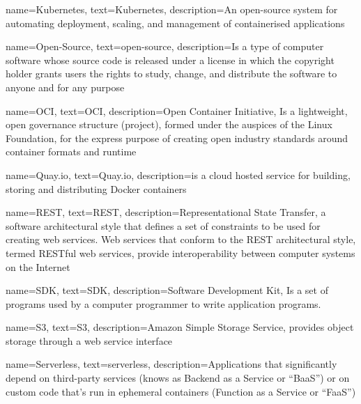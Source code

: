 {
    name={Kubernetes},
    text={Kubernetes},
    description={An open-source system for automating deployment, scaling, and management of containerised applications}
}

{
    name={Open-Source},
    text={open-source},
    description={Is a type of computer software whose source code is released under a license in which the copyright holder grants users the rights to study, change, and distribute the software to anyone and for any purpose}
}

{
    name={OCI},
    text={OCI},
    description={Open Container Initiative, Is a lightweight, open governance structure (project), formed under the auspices of the Linux Foundation, for the express purpose of creating open industry standards around container formats and runtime}
}

{
    name={Quay.io},
    text={Quay.io},
    description={is a cloud hosted service for building, storing and distributing Docker containers}
}

{
    name={REST},
    text={REST},
    description={Representational State Transfer, a software architectural style that defines a set of constraints to be used for creating web services. Web services that conform to the REST architectural style, termed RESTful web services, provide interoperability between computer systems on the Internet}
}

{
    name={SDK},
    text={SDK},
    description={Software Development Kit, Is a set of programs used by a computer programmer to write application programs.}
}

{
    name={S3},
    text={S3},
    description={Amazon Simple Storage Service, provides object storage through a web service interface}
}

{
    name={Serverless},
    text={serverless},
    description={Applications that significantly depend on third-party services (knows as Backend as a Service or “BaaS”) or on custom code that’s run in ephemeral containers (Function as a Service or “FaaS”)}
}


